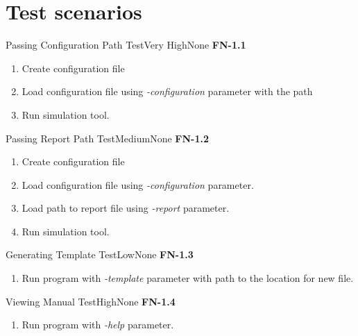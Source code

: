 \chapter{Test scenarios} \label{chp:test-scenarios}
	\begin{testcase}{Passing Configuration Path Test}{Very High}{None}
		{
			\textbf{FN-1.1}
		}
		{
			\begin{enumerate}
				\item Create configuration file
				\item Load configuration file using \emph{-configuration} parameter with the path
				\item Run simulation tool.
			\end{enumerate}
		}
	\end{testcase}
	
	\begin{testcase}{Passing Report Path Test}{Medium}{None}
		{
			\textbf{FN-1.2}
		}
		{
			\begin{enumerate}
				\item Create configuration file
				\item Load configuration file using \emph{-configuration} parameter.
				\item Load path to report file using \emph{-report} parameter.
				\item Run simulation tool.
			\end{enumerate}
		}
	\end{testcase}
	
	\begin{testcase}{Generating Template Test}{Low}{None}
		{
			\textbf{FN-1.3}
		}
		{
			\begin{enumerate}
				\item Run program with \emph{-template} parameter with path to the location for new file.
			\end{enumerate}
		}
	\end{testcase}
	\clearpage
	\begin{testcase}{Viewing Manual Test}{High}{None}
		{
			\textbf{FN-1.4}
		}
		{
			\begin{enumerate}
				\item Run program with \emph{-help} parameter.
			\end{enumerate}
		}
	\end{testcase}